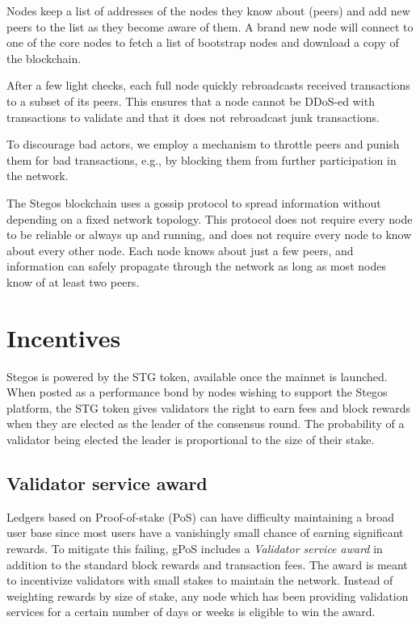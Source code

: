 \documentclass[8pt,fleqn,openany]{book}
\begin{document}
Nodes keep a list of addresses of the nodes they know about (peers) and add new peers to the list as they become aware of them. A brand new node will connect to one of the core nodes to fetch a list of bootstrap nodes and download a copy of the blockchain. 

After a few light checks, each full node quickly rebroadcasts received transactions to a subset of its peers. This ensures that a node cannot be DDoS-ed with transactions to validate and that it does not rebroadcast junk transactions.

To discourage bad actors, we employ a mechanism to throttle peers and punish them for bad transactions, e.g., by blocking them from further participation in the network.

The Stegos blockchain uses a gossip protocol to spread information without depending on a fixed network topology. This protocol does not require every node to be reliable or always up and running, and does not require every node to know about every other node. Each node knows about just a few peers, and information can safely propagate through the network as long as most nodes know of at least two peers.
	
\section{Incentives}
Stegos is powered by the STG token, available once the mainnet is launched. When posted as a performance bond by nodes wishing to support the Stegos platform, the STG token gives validators the right to earn fees and block rewards when they are elected as the leader of the consensus round. The probability of a validator being elected the leader is proportional to the size of their stake.

\subsection{Validator service award}\label{sec:service-award}
Ledgers based on Proof-of-stake (PoS) can have difficulty maintaining a broad user base since most users have a vanishingly small chance of earning significant rewards. To mitigate this failing, gPoS includes a \textit{Validator service award} in addition to the standard block rewards and transaction fees. The award is meant to incentivize validators with small stakes to maintain the network. Instead of weighting rewards by size of stake, any node which has been providing validation services for a certain number of days or weeks is eligible to win the award.
\end{document}
